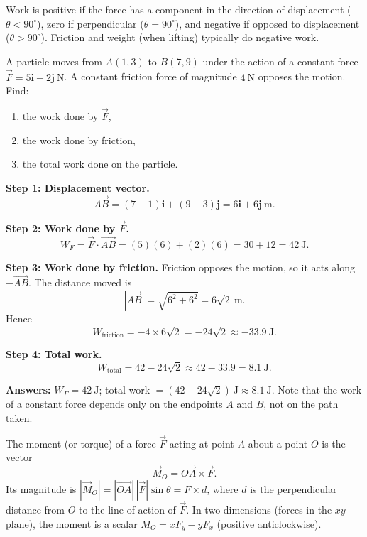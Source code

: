 \documentclass[11pt]{article}
\newcommand{\cle}[1]{{\popxbold\color{popdark}#1}}
\begin{document}
\begin{attention}
Work is positive if the force has a component in the direction of displacement ($\theta < 90^\circ$), zero if perpendicular ($\theta = 90^\circ$), and negative if opposed to displacement ($\theta > 90^\circ$). Friction and weight (when lifting) typically do negative work.
\end{attention}

\begin{exoresolu}
A particle moves from $A(1,3)$ to $B(7,9)$ under the action of a constant force $\vec{F} = 5\mathbf{i} + 2\mathbf{j}\ \mathrm{N}$. A constant friction force of magnitude $4\ \mathrm{N}$ opposes the motion. Find:
\begin{enumerate}
\item the work done by $\vec{F}$,
\item the work done by friction,
\item the total work done on the particle.
\end{enumerate}
\tcblower
\textbf{Step 1: Displacement vector.}
\[
\overrightarrow{AB} = (7-1)\mathbf{i} + (9-3)\mathbf{j} = 6\mathbf{i} + 6\mathbf{j}\ \mathrm{m}.
\]

\textbf{Step 2: Work done by $\vec{F}$.}
\[
W_F = \vec{F}\cdot\overrightarrow{AB} = (5)(6) + (2)(6) = 30 + 12 = 42\ \mathrm{J}.
\]

\textbf{Step 3: Work done by friction.}
Friction opposes the motion, so it acts along $-\overrightarrow{AB}$. The distance moved is
\[
|\overrightarrow{AB}| = \sqrt{6^2 + 6^2} = 6\sqrt{2}\ \mathrm{m}.
\]
Hence
\[
W_{\text{friction}} = -4 \times 6\sqrt{2} = -24\sqrt{2} \approx -33.9\ \mathrm{J}.
\]

\textbf{Step 4: Total work.}
\[
W_{\text{total}} = 42 - 24\sqrt{2} \approx 42 - 33.9 = 8.1\ \mathrm{J}.
\]

\textbf{Answers:} $W_F = 42\ \mathrm{J}$; total work $= (42 - 24\sqrt{2})\ \mathrm{J} \approx 8.1\ \mathrm{J}$. Note that the work of a constant force depends only on the endpoints $A$ and $B$, not on the path taken.
\end{exoresolu}

\begin{definition}
The \cle{moment} (or torque) of a force $\vec{F}$ acting at point $A$ about a point $O$ is the vector
\[
\vec{M}_O = \overrightarrow{OA} \times \vec{F}.
\]
Its magnitude is $|\vec{M}_O| = |\overrightarrow{OA}|\,|\vec{F}|\sin\theta = F \times d$, where $d$ is the perpendicular distance from $O$ to the line of action of $\vec{F}$. In two dimensions (forces in the $xy$-plane), the moment is a scalar $M_O = x F_y - y F_x$ (positive anticlockwise).
\end{definition}
\end{document}
